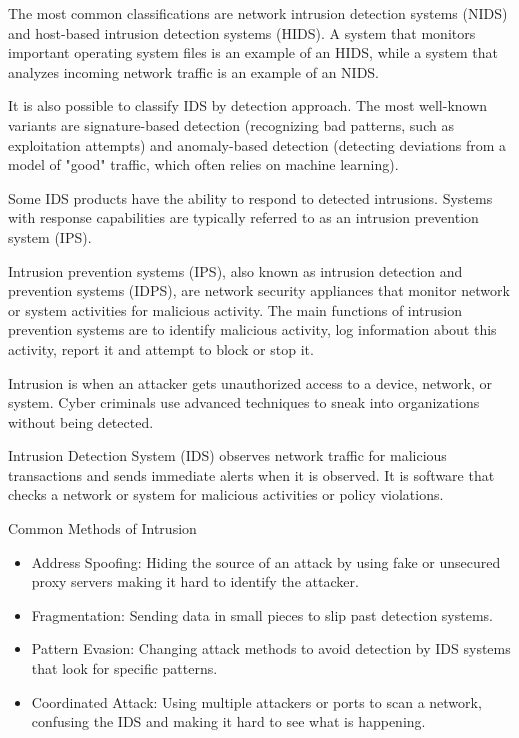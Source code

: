 The most common classifications are network intrusion detection systems (NIDS) and host-based intrusion detection systems (HIDS). 
A system that monitors important operating system files is an example of an HIDS, while a system 
that analyzes incoming network traffic is an example of an NIDS.

It is also possible to classify IDS by detection approach. 
The most well-known variants are signature-based detection (recognizing bad patterns, such as exploitation attempts) and 
anomaly-based detection (detecting deviations from a model of "good" traffic, which often relies on machine learning).

Some IDS products have the ability to respond to detected intrusions. 
Systems with response capabilities are typically referred to as an intrusion prevention system (IPS).

Intrusion prevention systems (IPS), also known as intrusion detection and prevention systems (IDPS), are network security 
appliances that monitor network or system activities for malicious activity. 
The main functions of intrusion prevention systems are to identify malicious activity, 
log information about this activity, report it and attempt to block or stop it.


Intrusion is when an attacker gets unauthorized access to a device, network, or system. 
Cyber criminals use advanced techniques to sneak into organizations without being detected.

Intrusion Detection System (IDS) observes network traffic for malicious transactions and sends immediate alerts when it is observed. 
It is software that checks a network or system for malicious activities or policy violations.

Common Methods of Intrusion
\begin{itemize}
    \item Address Spoofing: Hiding the source of an attack by using fake or unsecured proxy servers making it hard to identify the attacker.
    \item Fragmentation: Sending data in small pieces to slip past detection systems.
    \item Pattern Evasion: Changing attack methods to avoid detection by IDS systems that look for specific patterns.
    \item Coordinated Attack: Using multiple attackers or ports to scan a network, confusing the IDS and making it hard to see what is happening.
\end{itemize}

